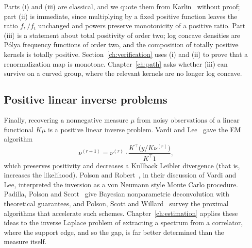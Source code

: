 Parts (i) and (iii) are classical, and we quote them from Karlin~\cite{Ka68} without proof; part (ii) is immediate, since multiplying by a fixed positive function leaves the ratio $f_{t'}/f_t$ unchanged and powers preserve monotonicity of a positive ratio. Part (iii) is a statement about total positivity of order two; log concave densities are P\'olya frequency functions of order two, and the composition of totally positive kernels is totally positive. Section~\ref{ch:verification} uses (i) and (ii) to prove that a renormalization map is monotone. Chapter~\ref{ch:path} asks whether (iii) can survive on a curved group, where the relevant kernels are no longer log concave.

\subsection{Positive linear inverse problems}\label{sec:pliv}

Finally, recovering a nonnegative measure $\mu$ from noisy observations of a linear functional $K\mu$ is a positive linear inverse problem. Vardi and Lee~\cite{VL} gave the EM algorithm
\[
\nu^{(r+1)}=\nu^{(r)}\cdot\frac{K^\top\big(y/K\nu^{(r)}\big)}{K^\top 1},
\]
which preserves positivity and decreases a Kullback Leibler divergence (that is, increases the likelihood). Polson and Robert~\cite{PR}, in their discussion of Vardi and Lee, interpreted the inversion as a von Neumann style Monte Carlo procedure. Padilla, Polson and Scott~\cite{PPS} give Bayesian nonparametric deconvolution with theoretical guarantees, and Polson, Scott and Willard~\cite{PSW15} survey the proximal algorithms that accelerate such schemes. Chapter~\ref{ch:estimation} applies these ideas to the inverse Laplace problem of extracting a spectrum from a correlator, where the support edge, and so the gap, is far better determined than the measure itself.

